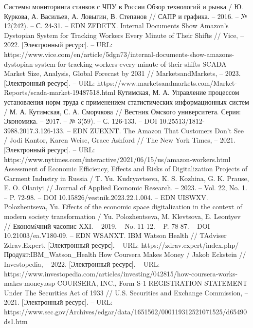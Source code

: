 \documentclass{article}
\begin{document}
\begin{thebibliography}{2}
 Системы мониторинга станков с ЧПУ в России Обзор технологий и рынка / Ю. Куркова, А. Васильев, А. Ловыгин, В. Степанов // САПР и графика. – 2016. – № 12(242). – С. 24-31. – EDN ZFDETX.
 Internal Documents Show Amazon’s Dystopian System for Tracking Workers Every Minute of Their Shifts // Vice, – 2022. [Электронный ресурс]. – URL: https://www.vice.com/en/article/5dgn73/internal-documents-show-amazons-dystopian-system-for-tracking-workers-every-minute-of-their-shifts
 SCADA Market Size, Analysis, Global Forecast by 2031 // MarketsandMarkets, – 2023. [Электронный ресурс]. – URL: https://www.marketsandmarkets.com/Market-Reports/scada-market-19487518.html
 Кутимская, М. А. Управление процессом установления норм труда с применением статистических информационных систем / М. А. Кутимская, С. А. Сморчкова // Вестник Омского университета. Серия: Экономика. – 2017. – № 3(59). – С. 126-133. – DOI 10.25513/1812-3988.2017.3.126-133. – EDN ZUEXNT.
 The Amazon That Customers Don’t See / Jodi Kantor, Karen Weise, Grace Ashford // The New York Times, – 2021. [Электронный ресурс]. – URL: https://www.nytimes.com/interactive/2021/06/15/us/amazon-workers.html
 Assessment of Economic Efficiency, Effects and Risks of Digitalization Projects of Garment Industry in Russia / T. Yu. Kudryavtseva, K. S. Kozhina, G. K. Prause, E. O. Olaniyi // Journal of Applied Economic Research. – 2023. – Vol. 22, No. 1. – P. 72-98. – DOI 10.15826/vestnik.2023.22.1.004. – EDN UISWXV.
 Polozhentseva, Yu. Effects of the economic space digitalization in the context of modern society transformation / Yu. Polozhentseva, M. Klevtsova, E. Leontyev // Економiчний часопис-XXI. – 2019. – No. 11-12. – P. 78-87. – DOI 10.21003/ea.V180-09. – EDN WSANXT.
 IBM Watson Health // TAdviser Zdrav.Expert. [Электронный ресурс]. – URL:  https://zdrav.expert/index.php/Продукт:IBM\_Watson\_Health
 How Coursera Makes Money / Jakob Eckstein // Investopedia, – 2022. [Электронный ресурс]. – URL: https://www.investopedia.com/articles/investing/042815/how-coursera-works-makes-money.asp
 COURSERA, INC., Form S-1 REGISTRATION STATEMENT Under The Securities Act of 1933 // U.S. Securities and Exchange Commission, – 2021. [Электронный ресурс]. – URL: https://www.sec.gov/Archives/edgar/data/1651562/000119312521071525/d65490ds1.htm
\end{thebibliography} 
\end{document}
